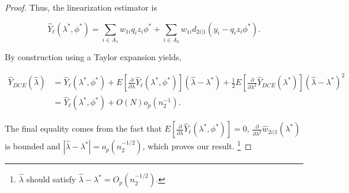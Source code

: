 \documentclass[12pt]{article}
\begin{document}
\begin{proof}
  Thus, the linearization estimator is

  $$\hat Y_\ell(\lambda^*, \phi^*) = \sum_{i \in A_1} w_{1i} q_i z_i \phi^* +
  \sum_{i \in A_2} w_{1i} d_{2i|1} (y_i - q_i z_i \phi^*).$$

  By construction using a Taylor expansion yields,

  \begin{align*}
    \hat Y_{DCE}(\hat \lambda) 
    &= \hat Y_\ell(\lambda^*, \phi^*) + 
    E\left[\frac{\partial}{\partial \lambda}\hat Y_\ell(\lambda^*,
    \phi^*)\right](\hat \lambda - \lambda^*) + \frac{1}{2}
    E\left[\frac{\partial}{\partial \lambda^2} \hat Y_{DCE}(\lambda^*)\right] (\hat
    \lambda - \lambda^*)^2\\
    &= \hat Y_\ell(\lambda^*, \phi^*) + O(N)o_p(n_2^{-1}).
  \end{align*}

  The final equality comes from the fact that 
  $E\left[\frac{\partial}{\partial \lambda}\hat Y_\ell(\lambda^*, \phi^*)\right]
  = 0$, $\frac{\partial}{\partial \lambda^2} \hat w_{2i|1}(\lambda^*)$ is
  bounded and $|\hat \lambda - \lambda^*| = o_p(n_2^{-1/2})$, which proves our
  result.
\footnote{$\hat{\lambda}$ should satisfy $\hat{\lambda} - \lambda^* = O_p (n_2^{-1/2})$. }
\end{proof}
\end{document}
